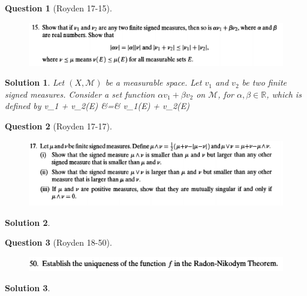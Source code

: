 \documentclass{article} %
\def\eQb#1\eQe{\begin{eqnarray*}#1\end{eqnarray*}}
\theoremstyle{quest}
\newtheorem*{question}{Question}
\newtheorem*{solution}{Solution}
\begin{document}
\newpage

\begin{question}[Royden 17-15]
\hfill
\begin{figure}[h!]
  \centering
    \includegraphics[width=1\textwidth]{rv-17-15.png}
\end{figure}
\end{question}
\begin{solution}
Let $(X,\mathscr{M})$ be a measurable space. 
Let $v_1$ and $v_2$ be two finite signed measures. Consider a 
set function $\alpha v_1 + \beta v_2$ on $\mathscr{M}$, for $\alpha , 
\beta \in \mathbb{R}$,
which is defined by
\eQb
\alpha v_1 + \beta v_2(E) &=& \alpha v_1(E) + \beta v_2(E) \\ 
\eQe
\end{solution}

\newpage

\begin{question}[Royden 17-17]
\hfill
\begin{figure}[h!]
  \centering
    \includegraphics[width=1\textwidth]{rv-17-17.png}
\end{figure}
\end{question}
\begin{solution}
\end{solution}

\newpage

\begin{question}[Royden 18-50]
\hfill
\begin{figure}[h!]
  \centering
    \includegraphics[width=1\textwidth]{rv-18-50.png}
\end{figure}
\end{question}
\begin{solution}
\end{solution}
\end{document}
